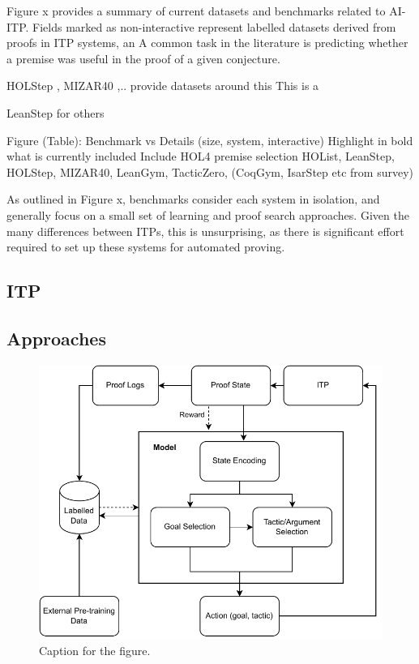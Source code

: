 \documentclass[letterpaper]{article} %
\begin{document}
    Figure x provides a summary of current datasets and benchmarks related to AI-ITP.
    Fields marked as non-interactive represent labelled datasets derived from proofs in ITP systems, an
    A common task in the literature is predicting whether a premise was useful in the proof of a given conjecture.

    HOLStep \cite{kaliszyk_holstep_2017}, MIZAR40 \cite{kaliszyk_mizar_2015},.. provide datasets around this
    This is a


    LeanStep for others

    Figure (Table):
    Benchmark vs Details (size, system, interactive)
    Highlight in bold what is currently included
    Include HOL4 premise selection
    HOList, LeanStep, HOLStep, MIZAR40, LeanGym, TacticZero, (CoqGym, IsarStep etc from survey)

    As outlined in Figure x, benchmarks consider each system in isolation, and generally focus on a small set of
    learning and proof search approaches.
    Given the many differences between ITPs, this is unsurprising, as there is significant effort required to set
    up these systems for automated proving.

%
%
    \subsection{ITP}

    \subsection{Approaches}
    \begin{figure}[h]
        \centering
        \includegraphics[width=\linewidth]{AI-ITP}
        \caption{Caption for the figure.}
        \label{fig:ai-itp}
    \end{figure}
\end{document}
